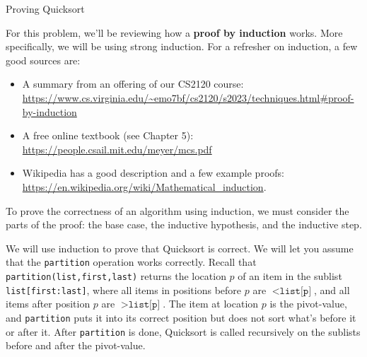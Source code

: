 \documentclass[10pt]{article}
\begin{document}
\thispagestyle{empty}
\handout

\begin{problem} Proving Quicksort \end{problem}

For this problem, we'll be reviewing how a \textbf{proof by induction} works.  More specifically, we will be using strong induction.  For a refresher on induction, a few good sources are:
\begin{itemize}    
    \item A summary from an offering of our CS2120 course: \\
    \url {https://www.cs.virginia.edu/~emo7bf/cs2120/s2023/techniques.html#proof-by-induction}

    \item A free online textbook (see Chapter 5): \\ 
    \url {https://people.csail.mit.edu/meyer/mcs.pdf}

    \item Wikipedia has a good description and a few example proofs: \\
    \url{https://en.wikipedia.org/wiki/Mathematical_induction}.  
\end{itemize}

To prove the correctness of an algorithm using induction, we must consider the parts of the proof: the base case, the inductive hypothesis, and the inductive step.

We will use induction to prove that Quicksort is correct.  We will let you assume that the \texttt{partition} operation works correctly.  Recall that \texttt{partition(list,first,last)} returns the location $p$ of an item in the sublist \texttt{list[first:last]}, where all items in positions before $p$ are $< \texttt{list[p]}$, and all items after position $p$ are $> \texttt{list[p]}$.  The item at location $p$ is the pivot-value, and \texttt{partition} puts it into its correct position but does not sort what's before it or after it.  After \texttt{partition} is done, Quicksort is called recursively on the sublists before and after the pivot-value.
\end{document}
